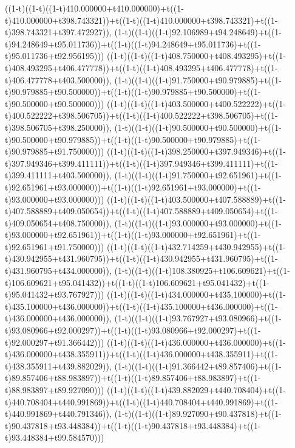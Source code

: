 ((1-t)((1-t)((1-t)410.000000+t410.000000)+t((1-t)410.000000+t398.743321))+t((1-t)((1-t)410.000000+t398.743321)+t((1-t)398.743321+t397.472927)),                                     (1-t)((1-t)((1-t)92.106989+t94.248649)+t((1-t)94.248649+t95.011736))+t((1-t)((1-t)94.248649+t95.011736)+t((1-t)95.011736+t92.956195)))
((1-t)((1-t)((1-t)408.750000+t408.493295)+t((1-t)408.493295+t406.477778))+t((1-t)((1-t)408.493295+t406.477778)+t((1-t)406.477778+t403.500000)),                                     (1-t)((1-t)((1-t)91.750000+t90.979885)+t((1-t)90.979885+t90.500000))+t((1-t)((1-t)90.979885+t90.500000)+t((1-t)90.500000+t90.500000)))
((1-t)((1-t)((1-t)403.500000+t400.522222)+t((1-t)400.522222+t398.506705))+t((1-t)((1-t)400.522222+t398.506705)+t((1-t)398.506705+t398.250000)),                                     (1-t)((1-t)((1-t)90.500000+t90.500000)+t((1-t)90.500000+t90.979885))+t((1-t)((1-t)90.500000+t90.979885)+t((1-t)90.979885+t91.750000)))
((1-t)((1-t)((1-t)398.250000+t397.949346)+t((1-t)397.949346+t399.411111))+t((1-t)((1-t)397.949346+t399.411111)+t((1-t)399.411111+t403.500000)),                                     (1-t)((1-t)((1-t)91.750000+t92.651961)+t((1-t)92.651961+t93.000000))+t((1-t)((1-t)92.651961+t93.000000)+t((1-t)93.000000+t93.000000)))
((1-t)((1-t)((1-t)403.500000+t407.588889)+t((1-t)407.588889+t409.050654))+t((1-t)((1-t)407.588889+t409.050654)+t((1-t)409.050654+t408.750000)),                                     (1-t)((1-t)((1-t)93.000000+t93.000000)+t((1-t)93.000000+t92.651961))+t((1-t)((1-t)93.000000+t92.651961)+t((1-t)92.651961+t91.750000)))
((1-t)((1-t)((1-t)432.714259+t430.942955)+t((1-t)430.942955+t431.960795))+t((1-t)((1-t)430.942955+t431.960795)+t((1-t)431.960795+t434.000000)),                                     (1-t)((1-t)((1-t)108.380925+t106.609621)+t((1-t)106.609621+t95.041432))+t((1-t)((1-t)106.609621+t95.041432)+t((1-t)95.041432+t93.767927)))
((1-t)((1-t)((1-t)434.000000+t435.100000)+t((1-t)435.100000+t436.000000))+t((1-t)((1-t)435.100000+t436.000000)+t((1-t)436.000000+t436.000000)),                                     (1-t)((1-t)((1-t)93.767927+t93.080966)+t((1-t)93.080966+t92.000297))+t((1-t)((1-t)93.080966+t92.000297)+t((1-t)92.000297+t91.366442)))
((1-t)((1-t)((1-t)436.000000+t436.000000)+t((1-t)436.000000+t438.355911))+t((1-t)((1-t)436.000000+t438.355911)+t((1-t)438.355911+t439.882029)),                                     (1-t)((1-t)((1-t)91.366442+t89.857406)+t((1-t)89.857406+t88.983897))+t((1-t)((1-t)89.857406+t88.983897)+t((1-t)88.983897+t89.927090)))
((1-t)((1-t)((1-t)439.882029+t440.708404)+t((1-t)440.708404+t440.991869))+t((1-t)((1-t)440.708404+t440.991869)+t((1-t)440.991869+t440.791346)),                                     (1-t)((1-t)((1-t)89.927090+t90.437818)+t((1-t)90.437818+t93.448384))+t((1-t)((1-t)90.437818+t93.448384)+t((1-t)93.448384+t99.584570)))
